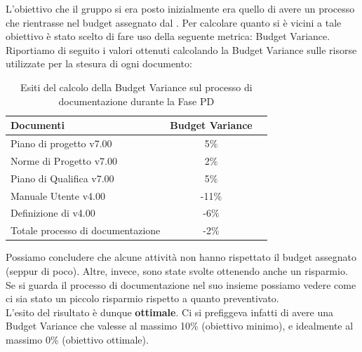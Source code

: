 							
				L'obiettivo che il gruppo si era posto inizialmente era quello di avere un processo che rientrasse nel budget assegnato dal . Per calcolare quanto si è vicini a tale obiettivo è stato scelto di fare uso della seguente metrica: Budget Variance.\\
				Riportiamo di seguito i valori ottenuti calcolando la Budget Variance sulle risorse utilizzate per la stesura di ogni documento:
				\begin{table}[H]
					\centering
					\begin{tabu}{| l | c | c |}
						\hline
						Documenti 							& Budget Variance   \\ \hline \hline
						Piano di progetto v7.00				& 5\%               \\ \hline
						Norme di Progetto v7.00 			& 2\%               \\ \hline
						Piano di Qualifica v7.00 			& 5\%               \\ \hline
						Manuale Utente v4.00 				& -11\%             \\ \hline
						Definizione di  v4.00 		& -6\%              \\ \hline
						Totale processo di documentazione 	& -2\%              \\ \hline
					\end{tabu}
					\caption{Esiti del calcolo della Budget Variance sul processo di documentazione durante la Fase PD}
				\end{table}
				Possiamo concludere che alcune attività non hanno rispettato il budget assegnato (seppur di poco). Altre, invece, sono state svolte ottenendo anche un risparmio. Se si guarda il processo di documentazione nel suo insieme possiamo vedere come ci sia stato un piccolo risparmio rispetto a quanto preventivato.\\
				L'esito del risultato è dunque \textbf{ottimale}. Ci si prefiggeva infatti di avere una Budget Variance che valesse al massimo 10\% (obiettivo minimo), e idealmente al massimo 0\% (obiettivo ottimale).
							
